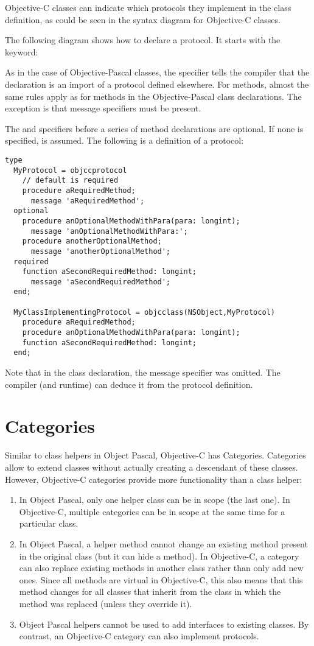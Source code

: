 Objective-C classes can indicate which protocols they implement in the class
definition, as could be seen in the syntax diagram for Objective-C classes.

The following diagram shows how to declare a protocol. It starts with the
 keyword:

As in the case of Objective-Pascal classes, the  specifier tells
the compiler that the declaration is an import of a protocol defined
elsewhere. For methods, almost the same rules apply as for methods in
the Objective-Pascal class declarations. The exception is that message
specifiers must be present.

The  and  specifiers before a series of
method declarations are optional. If none is specified,  is
assumed. The following is a definition of a protocol:
\begin{verbatim}
type
  MyProtocol = objccprotocol
    // default is required
    procedure aRequiredMethod;
      message 'aRequiredMethod';
  optional
    procedure anOptionalMethodWithPara(para: longint);
      message 'anOptionalMethodWithPara:';
    procedure anotherOptionalMethod;
      message 'anotherOptionalMethod';
  required
    function aSecondRequiredMethod: longint;
      message 'aSecondRequiredMethod';
  end;

  MyClassImplementingProtocol = objcclass(NSObject,MyProtocol)
    procedure aRequiredMethod;
    procedure anOptionalMethodWithPara(para: longint);
    function aSecondRequiredMethod: longint;
  end;
\end{verbatim}
Note that in the class declaration, the message specifier was omitted.
The compiler (and runtime) can deduce it from the protocol definition.

\section{Categories}
Similar to class helpers in Object Pascal, Objective-C has Categories.
Categories allow to extend classes without actually creating a descendant of
these classes. However, Objective-C categories provide more functionality
than a class helper:
\begin{enumerate}
\item In Object Pascal, only one helper class can be in scope (the last one).
In Objective-C, multiple categories can be in scope at the same time for
a particular class.
\item In Object Pascal, a helper method cannot change an existing method
present in the original class (but it can hide a method). In Objective-C, a category can also
replace existing methods in another class rather than only add new ones.
Since all methods are virtual in Objective-C, this also means that this
method changes for all classes that inherit from the class in which the
method was replaced (unless they override it).
\item Object Pascal helpers cannot be used to add interfaces to existing
classes. By contrast, an Objective-C category can also implement protocols.
\end{enumerate}

